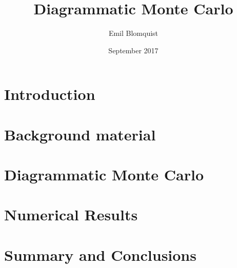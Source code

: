 \documentclass[nocoverpage,swedish,g5paper]{thesis}
\title{Diagrammatic Monte Carlo}
\author{Emil Blomquist}
\date{September 2017}
\begin{document}
\begin{abstract}

\end{abstract}

\begin{otherlanguage}{swedish}
\begin{foreginabstract}

\end{foreginabstract}
\end{otherlanguage}

\begin{preface}

\end{preface}

\tableofcontents

\mainmatter




\chapter{Introduction}


\chapter{Background material}


\chapter{Diagrammatic Monte Carlo}


\chapter{Numerical Results}


\chapter{Summary and Conclusions}


%

\cleardoublepage
{}




%
\end{document}
